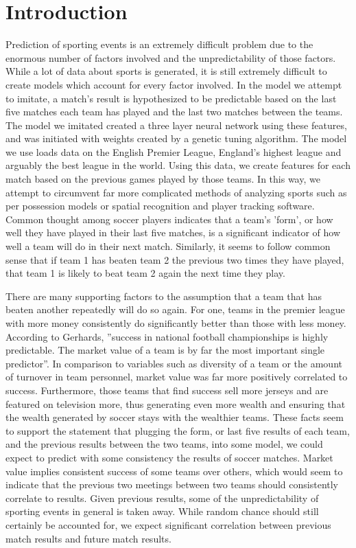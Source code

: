 \documentclass[sigconf]{acmart}
\begin{document}
\section{Introduction}
Prediction of sporting events is an extremely difficult problem due to the enormous number of factors involved and the unpredictability of those factors. While a lot of data about sports is generated, it is still extremely difficult to create models which account for every factor involved. In the model we attempt to imitate, a match's result is hypothesized to be predictable based on the last five matches each team has played and the last two matches between the teams. The model we imitated created a three layer neural network using these features, and was initiated with weights created by a genetic tuning algorithm. The model we use loads data on the English Premier League, England's highest league and arguably the best league in the world. Using this data, we create features for each match based on the previous games played by those teams. In this way, we attempt to circumvent far more complicated methods of analyzing sports such as per possession models or spatial recognition and player tracking software. Common thought among soccer players indicates that a team's 'form', or how well they have played in their last five matches, is a significant indicator of how well a team will do in their next match. Similarly, it seems to follow common sense that if team 1 has beaten team 2 the previous two times they have played, that team 1 is likely to beat team 2 again the next time they play. 

There are many supporting factors to the assumption that a team that has beaten another repeatedly will do so again. For one, teams in the premier league with more money consistently do significantly better than those with less money. According to Gerhards, ''success in national football championships is highly predictable. The market value of a team is by far the most important single predictor''. \cite{MarketValue} In comparison to variables such as diversity of a team or the amount of turnover in team personnel, market value was far more positively correlated to success. Furthermore, those teams that find success sell more jerseys and are featured on television more, thus generating even more wealth and ensuring that the wealth generated by soccer stays with the wealthier teams. 
These facts seem to support the statement that plugging the form, or last five results of each team, and the previous results between the two teams, into some model, we could expect to predict with some consistency the results of soccer matches. Market value implies consistent success of some teams over others, which would seem to indicate that the previous two meetings between two teams should consistently correlate to results. Given previous results, some of the unpredictability of sporting events in general is taken away. While random chance should still certainly be accounted for, we expect significant correlation between previous match results and future match results.
\end{document}
